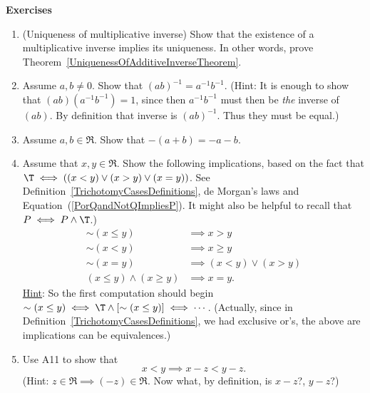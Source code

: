 \begin{center}{\Large{\bf Exercises}}\end{center}
\begin{multicols}{2}
\begin{enumerate}

\item (Uniqueness of multiplicative inverse)
Show that the existence of a multiplicative inverse
implies its uniqueness.  In other words, prove
Theorem~\ref{UniquenessOfAdditiveInverseTheorem}.
\label{UniquenessOfIdentitiesExercise}

\item Assume $a,b\ne0$. Show that $(ab)^{-1}=a^{-1}b^{-1}$.
(Hint: It is enough to show that $(ab)(a^{-1}b^{-1})=1$,
since then $a^{-1}b^{-1}$ must then be {\it the} inverse of
$(ab)$.  By definition that inverse is $(ab)^{-1}$.
Thus they must be equal.)
\item Assume $a,b\in\Re$.  Show that $-(a+b)=-a-b$.\label{-(x+y)=-x-yExercise}
\item Assume that $x,y\in\Re$.  Show the following
implications, based on the fact that
$\T\iff((x<y)\vee(x>y)\vee(x=y))$.
See Definition~\ref{TrichotomyCasesDefinitions},
de Morgan's laws and Equation~(\ref{PorQandNotQImpliesP}).
It might also be helpful to recall that
$P\iff P\wedge\T$.)
\begin{align*}
\sim(x\le y)&\implies x>y\\
\sim(x<y)&\implies x\ge y\\
\sim(x=y)&\implies (x<y)\vee(x>y)\\
(x\le y)\wedge(x\ge y)&\implies x=y.\end{align*}
\underline{Hint}: So the first computation should 
begin $\sim(x\le y)\iff\T\wedge[\sim(x\le y)]\iff\cdots$.
(Actually, since in Definition~\ref{TrichotomyCasesDefinitions},
we had exclusive or's, the above are implications can be 
equivalences.)

\item Use A11 to show that
$$x<y\implies x-z<y-z.$$  (Hint: 
$z\in\Re\implies(-z)\in\Re$.  Now what, by definition, is $x-z$?, $y-z$?)




\end{enumerate}
\end{multicols}
